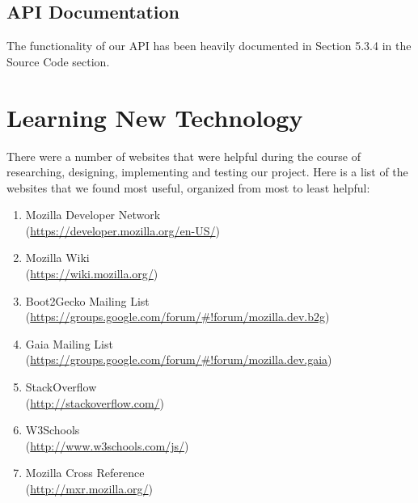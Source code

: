 \documentclass[12pt]{article}
\begin{document}
\subsection{API Documentation}
The functionality of our API has been heavily documented in Section 5.3.4 in the Source Code section.

\pagebreak

\section{Learning New Technology}
There were a number of websites that were helpful during the course of researching, designing, implementing and testing our project. Here is a list of the websites that we found most useful, organized from most to least helpful:
\begin{enumerate}
	\item Mozilla Developer Network\\ (\href{https://developer.mozilla.org/en-US/}{https://developer.mozilla.org/en-US/})
	\item Mozilla Wiki\\ (\href{https://wiki.mozilla.org/}{https://wiki.mozilla.org/})
	\item Boot2Gecko Mailing List\\ (\href{https://groups.google.com/forum/\#!forum/mozilla.dev.b2g}{https://groups.google.com/forum/\#!forum/mozilla.dev.b2g})
	\item Gaia Mailing List\\ (\href{https://groups.google.com/forum/\#!forum/mozilla.dev.gaia}{https://groups.google.com/forum/\#!forum/mozilla.dev.gaia})
	\item StackOverflow\\ (\href{http://stackoverflow.com/}{http://stackoverflow.com/})
	\item W3Schools\\ (\href{http://www.w3schools.com/js/}{http://www.w3schools.com/js/}) 
	\item Mozilla Cross Reference\\ (\href{http://mxr.mozilla.org/}{http://mxr.mozilla.org/})
\end{enumerate}
	
\end{document}
